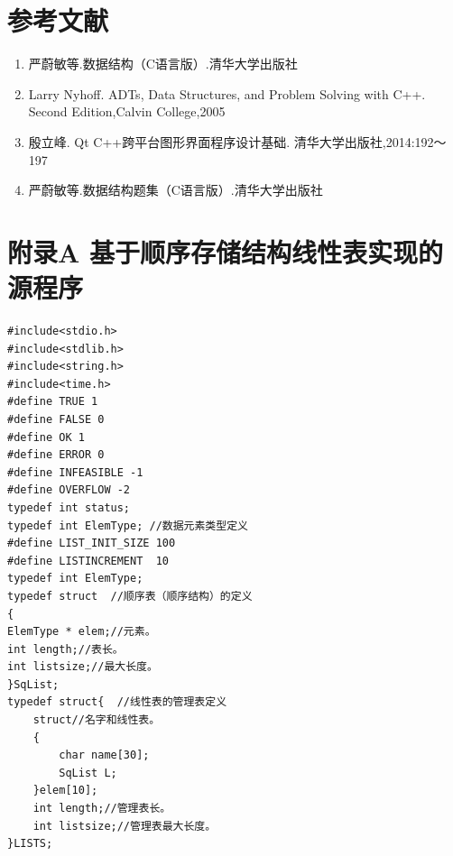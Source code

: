 \documentclass[supercite]{Experimental_Report}
\theoremstyle{definition}
\begin{document}
\newpage
\section{参考文献}
\begin{enumerate}
	\item 严蔚敏等.数据结构（C语言版）.清华大学出版社
    \item Larry Nyhoff. ADTs, Data Structures, and Problem Solving with C++. Second Edition,Calvin College,2005
	\item 殷立峰. Qt C++跨平台图形界面程序设计基础. 清华大学出版社,2014:192～197
    \item 严蔚敏等.数据结构题集（C语言版）.清华大学出版社
\end{enumerate}
\newpage

\section{附录A 基于顺序存储结构线性表实现的源程序}
\begin{lstlisting}[title =def,frame=none]
#include<stdio.h>
#include<stdlib.h>
#include<string.h>
#include<time.h>
#define TRUE 1
#define FALSE 0
#define OK 1
#define ERROR 0
#define INFEASIBLE -1
#define OVERFLOW -2
typedef int status;
typedef int ElemType; //数据元素类型定义
#define LIST_INIT_SIZE 100
#define LISTINCREMENT  10
typedef int ElemType;
typedef struct  //顺序表（顺序结构）的定义
{
ElemType * elem;//元素。 
int length;//表长。 
int listsize;//最大长度。 
}SqList;
typedef struct{  //线性表的管理表定义
    struct//名字和线性表。 
	{
		char name[30];
    	SqList L;	
    }elem[10];
    int length;//管理表长。 
    int listsize;//管理表最大长度。 
}LISTS;
\end{lstlisting}
\end{document}
